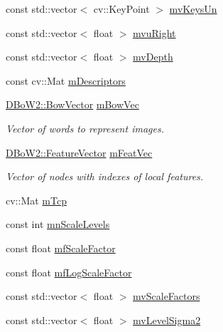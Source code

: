 \begin{DoxyCompactItemize}
\item 
const std\+::vector$<$ cv\+::\+Key\+Point $>$ \mbox{\hyperlink{class_o_r_b___s_l_a_m2_1_1_key_frame_aaf6c65fc098f41ff418a65934f514ce3}{mv\+Keys\+Un}}
\item 
const std\+::vector$<$ float $>$ \mbox{\hyperlink{class_o_r_b___s_l_a_m2_1_1_key_frame_a3e11913b55821be56c9f447ab6437dd5}{mvu\+Right}}
\item 
const std\+::vector$<$ float $>$ \mbox{\hyperlink{class_o_r_b___s_l_a_m2_1_1_key_frame_a01da66d3e5e482b239ec22d2487a6085}{mv\+Depth}}
\item 
const cv\+::\+Mat \mbox{\hyperlink{class_o_r_b___s_l_a_m2_1_1_key_frame_ae08ac0ce59e2c003c182f946de3b3bc0}{m\+Descriptors}}
\item 
\mbox{\hyperlink{class_d_bo_w2_1_1_bow_vector}{D\+Bo\+W2\+::\+Bow\+Vector}} \mbox{\hyperlink{class_o_r_b___s_l_a_m2_1_1_key_frame_a70cb0dee48e804c5b1f30afd0ce99787}{m\+Bow\+Vec}}
\begin{DoxyCompactList}\small\item\em Vector of words to represent images. \end{DoxyCompactList}\item 
\mbox{\hyperlink{class_d_bo_w2_1_1_feature_vector}{D\+Bo\+W2\+::\+Feature\+Vector}} \mbox{\hyperlink{class_o_r_b___s_l_a_m2_1_1_key_frame_a3588bf0a927e8ab838c614565ee7de20}{m\+Feat\+Vec}}
\begin{DoxyCompactList}\small\item\em Vector of nodes with indexes of local features. \end{DoxyCompactList}\item 
cv\+::\+Mat \mbox{\hyperlink{class_o_r_b___s_l_a_m2_1_1_key_frame_aab9c8e2e4aa4757ad0be28b2f49a3cf7}{m\+Tcp}}
\item 
const int \mbox{\hyperlink{class_o_r_b___s_l_a_m2_1_1_key_frame_abd3b2544330774672483656955e0ca03}{mn\+Scale\+Levels}}
\item 
const float \mbox{\hyperlink{class_o_r_b___s_l_a_m2_1_1_key_frame_a18fbd1aa1da7c7cd68cb05d8e5b78a08}{mf\+Scale\+Factor}}
\item 
const float \mbox{\hyperlink{class_o_r_b___s_l_a_m2_1_1_key_frame_ae7ca053915d4aaba66c1fd5962182d14}{mf\+Log\+Scale\+Factor}}
\item 
const std\+::vector$<$ float $>$ \mbox{\hyperlink{class_o_r_b___s_l_a_m2_1_1_key_frame_a8cdc02a7bccd3b75e61351a1f14f9c04}{mv\+Scale\+Factors}}
\item 
const std\+::vector$<$ float $>$ \mbox{\hyperlink{class_o_r_b___s_l_a_m2_1_1_key_frame_aa4a9029bf7ea62953ac38644756fcd3b}{mv\+Level\+Sigma2}}

\end{DoxyCompactItemize}
